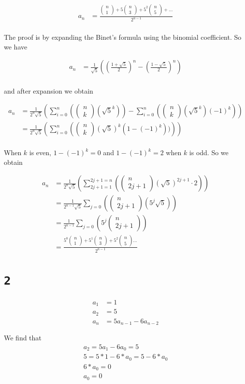 \documentclass[a4paper,11pt]{report}
\newcommand*{\bin}[2]{\begin{pmatrix}#1 \\ #2\end{pmatrix}}
\begin{document}
\begin{align*}
  a_n &= \frac{\bin{n}{1} + 5 \bin{n}{3} + 5^2 \bin{n}{5} + \dots}{2^{n-1}} \\
\end{align*}

The proof is by expanding the Binet's formula using the binomial coefficient. So
we have

\begin{align*}
  a_n &= \frac{1}{\sqrt{5}} ((\frac{1 + \sqrt{5}}{2})^n - (\frac{1 - \sqrt{5}}{2})^n) \\
\end{align*}

and after expansion we obtain

\begin{align*}
  a_n &=  \frac{1}{2^n \sqrt{5}} \left(\sum_{i=0}^{n}\left(\bin{n}{k}(\sqrt{5}^k)\right) - \sum_{i=0}^{n}\left(\bin{n}{k}(\sqrt{5}^k)(-1)^k\right)\right) \\
      &= \frac{1}{2^n \sqrt{5}} \left(\sum_{i=0}^{n}\left(\bin{n}{k} (\sqrt{5})^k (1-(-1)^k))\right) \right) \\
\end{align*}

When $k$ is even, $1-(-1)^k = 0$ and $1-(-1)^k = 2$ when $k$ is odd. So we
obtain

\begin{align*}
  a_n &= \frac{1}{2^n \sqrt{5}} \left(\sum_{2j+1=1}^{2j+1=n}\left(\bin{n}{2j+1} (\sqrt{5})^{2j+1} \cdot 2 \right) \right) \\
      &= \frac{1}{2^{n-1} \sqrt{5}} \sum_{j=0} \left( \bin{n}{2j+1}(5^j \sqrt{5}) \right) \\
      &= \frac{1}{2^{n-1}} \sum_{j=0} \left( 5^j \bin{n}{2j+1} \right) \\
      &= \frac{5^0 \bin{n}{1} + 5^1 \bin{n}{3} + 5^2 \bin{n}{5} \dots}{2^{n-1}}
\end{align*}


\section*{\texttt{2}}

\begin{align*}
  a_1 &= 1 \\
  a_2 &= 5 \\
  a_n &= 5a_{n-1} - 6a_{n-2}
\end{align*}

We find that
\begin{gather*}
  a_2 = 5a_1 - 6a_0 = 5 \\
  5 = 5 * 1 - 6 * a_0 = 5 - 6 * a_0 \\
  6 * a_0 = 0 \\
  a_0 = 0
\end{gather*}
\end{document}
